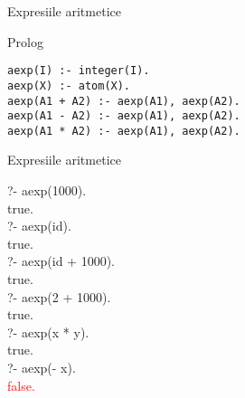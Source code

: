 \documentclass[xcolor=x11names,compress,10pt]{beamer}
\begin{document}
\begin{frame}[fragile]{Expresiile aritmetice}

 \vspace{-5ex}\begin{syntaxBlock}{\AExp}
  \alert{
  \begin{itemize}
  \item[]\renewcommand{\syntaxKeyword}{}
  \syntax{\Int\Smid\Id}{}
  \syntaxCont{\AExp\terminal{+}\AExp\Smid\AExp\terminal{-}\AExp\Smid\AExp\terminal{*}\AExp}{}
  \end{itemize}}
  \end{syntaxBlock}
  
\begin{block}{Prolog}

\begin{verbatim}
aexp(I) :- integer(I).
aexp(X) :- atom(X).
aexp(A1 + A2) :- aexp(A1), aexp(A2).
aexp(A1 - A2) :- aexp(A1), aexp(A2).
aexp(A1 * A2) :- aexp(A1), aexp(A2).
\end{verbatim}
\end{block}
\end{frame}

\begin{frame}[fragile]{Expresiile aritmetice}
\begin{example}
?- aexp(1000).\\
true.\\

?- aexp(id).\\
true.\\

?- aexp(id + 1000).\\
true. \\


?- aexp(2 + 1000).\\
true. \\


?- aexp(x * y).\\
true.\\

?- aexp(- x).\\
\textcolor{red}{false.}
\end{example}
\end{frame}
\end{document}
